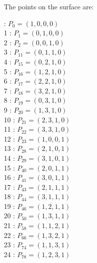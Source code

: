 \documentclass{article}
\begin{document}
{The points on the surface are:\\
\begin{multicols}{3}
 : $P_{0}=( 1, 0, 0, 0 )$\\
1 : $P_{1}=( 0, 1, 0, 0 )$\\
2 : $P_{2}=( 0, 0, 1, 0 )$\\
3 : $P_{11}=( 0, 1, 1, 0 )$\\
4 : $P_{15}=( 0, 2, 1, 0 )$\\
5 : $P_{16}=( 1, 2, 1, 0 )$\\
6 : $P_{17}=( 2, 2, 1, 0 )$\\
7 : $P_{18}=( 3, 2, 1, 0 )$\\
8 : $P_{19}=( 0, 3, 1, 0 )$\\
9 : $P_{20}=( 1, 3, 1, 0 )$\\
10 : $P_{21}=( 2, 3, 1, 0 )$\\
11 : $P_{22}=( 3, 3, 1, 0 )$\\
12 : $P_{23}=( 1, 0, 0, 1 )$\\
13 : $P_{28}=( 2, 1, 0, 1 )$\\
14 : $P_{29}=( 3, 1, 0, 1 )$\\
15 : $P_{40}=( 2, 0, 1, 1 )$\\
16 : $P_{41}=( 3, 0, 1, 1 )$\\
17 : $P_{43}=( 2, 1, 1, 1 )$\\
18 : $P_{44}=( 3, 1, 1, 1 )$\\
19 : $P_{46}=( 1, 2, 1, 1 )$\\
20 : $P_{50}=( 1, 3, 1, 1 )$\\
21 : $P_{58}=( 1, 1, 2, 1 )$\\
22 : $P_{66}=( 1, 3, 2, 1 )$\\
23 : $P_{74}=( 1, 1, 3, 1 )$\\
24 : $P_{78}=( 1, 2, 3, 1 )$\\
\end{multicols}


%


%


}%
\end{document}
